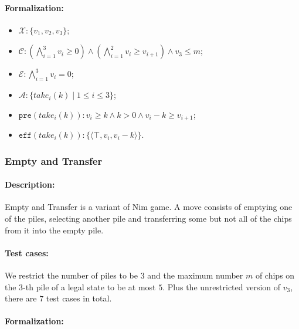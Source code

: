 \documentclass[review]{elsarticle}
\newcommand{\set}[1]{\{ #1 \}}
\newcommand{\tuple}[1]{\langle {#1} \rangle}
\newcommand{\true}{\top}
\newcommand{\statevar}{\mathcal{X}}
\newcommand{\act}{\mathcal{A}}
\newcommand{\constraint}{\mathcal{C}}
\newcommand{\estate}{\mathcal{E}}
\newcommand{\pre}{\mathtt{pre}}
\newcommand{\eff}{\mathtt{eff}}
\begin{document}
\paragraph{Formalization:}

\begin{itemize}
	\item $\statevar: \set{v_1,v_2,v_3}$;
	\item $\constraint: (\bigwedge_{i=1}^{3} v_i \ge 0) \wedge (\bigwedge_{i=1}^{2} v_i \ge v_{i+1}) \wedge v_3 \le m$;
	\item $\estate: \bigwedge_{i=1}^{3} v_i = 0$;
	\item $\act:\set{take_i(k) {\mid} 1\le i\le 3}$;
	\item $\pre(take_i(k)) : v_i \ge k \wedge k > 0 \wedge v_i -k \ge v_{i+1}$;
	\item $\eff(take_i(k)) : \set{\tuple{\true,v_i,v_i -k}}$.
\end{itemize}

\subsubsection{Empty and Transfer \protect\cite{Fer1998}}
\paragraph{Description:} 
Empty and Transfer is a variant of Nim game.
A move consists of emptying one of the piles, selecting another pile and transferring some but not all of the chips from it into the empty pile. 

\paragraph{Test cases:}
We restrict the number of piles to be $3$ and the maximum number $m$ of chips on the $3$-th pile of a legal state to be at most $5$. 
Plus the unrestricted version of $v_3$, there are $7$ test cases in total.

\paragraph{Formalization:}
\end{document}
